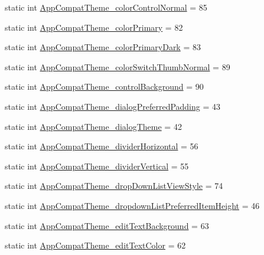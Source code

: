 \begin{DoxyCompactItemize}
\item 
static int \hyperlink{classandroid_1_1support_1_1v4_1_1R_1_1styleable_a6b58e52a257785d873805b5e1779ea2b}{App\+Compat\+Theme\+\_\+color\+Control\+Normal} = 85
\item 
static int \hyperlink{classandroid_1_1support_1_1v4_1_1R_1_1styleable_a7666c3232d0c44882bd1b7b81694ec22}{App\+Compat\+Theme\+\_\+color\+Primary} = 82
\item 
static int \hyperlink{classandroid_1_1support_1_1v4_1_1R_1_1styleable_a86a4e758d00bd09c64f8125e28a09831}{App\+Compat\+Theme\+\_\+color\+Primary\+Dark} = 83
\item 
static int \hyperlink{classandroid_1_1support_1_1v4_1_1R_1_1styleable_ae369a455853f8d39ed5e796399c80ca1}{App\+Compat\+Theme\+\_\+color\+Switch\+Thumb\+Normal} = 89
\item 
static int \hyperlink{classandroid_1_1support_1_1v4_1_1R_1_1styleable_a69fdd6182b11eb1697d971b62e02f11b}{App\+Compat\+Theme\+\_\+control\+Background} = 90
\item 
static int \hyperlink{classandroid_1_1support_1_1v4_1_1R_1_1styleable_a43f2be5deff68402fef3dcc0311e5255}{App\+Compat\+Theme\+\_\+dialog\+Preferred\+Padding} = 43
\item 
static int \hyperlink{classandroid_1_1support_1_1v4_1_1R_1_1styleable_a3574ec976e7476da7ab6c1ba08c24d15}{App\+Compat\+Theme\+\_\+dialog\+Theme} = 42
\item 
static int \hyperlink{classandroid_1_1support_1_1v4_1_1R_1_1styleable_a4f40263c3e11d2deb92c237d96ea15f0}{App\+Compat\+Theme\+\_\+divider\+Horizontal} = 56
\item 
static int \hyperlink{classandroid_1_1support_1_1v4_1_1R_1_1styleable_a480131370c6899cceeda9f48459b5bdc}{App\+Compat\+Theme\+\_\+divider\+Vertical} = 55
\item 
static int \hyperlink{classandroid_1_1support_1_1v4_1_1R_1_1styleable_a0da4ef3e81a5ae109c029dd45167387f}{App\+Compat\+Theme\+\_\+drop\+Down\+List\+View\+Style} = 74
\item 
static int \hyperlink{classandroid_1_1support_1_1v4_1_1R_1_1styleable_aff7f53164ea3cbce6587faad4b37b944}{App\+Compat\+Theme\+\_\+dropdown\+List\+Preferred\+Item\+Height} = 46
\item 
static int \hyperlink{classandroid_1_1support_1_1v4_1_1R_1_1styleable_a18052ba0b1c9793bc937f0c80db13b4f}{App\+Compat\+Theme\+\_\+edit\+Text\+Background} = 63
\item 
static int \hyperlink{classandroid_1_1support_1_1v4_1_1R_1_1styleable_a61b858b456732138a1c8d3fe6521a2a2}{App\+Compat\+Theme\+\_\+edit\+Text\+Color} = 62

\end{DoxyCompactItemize}
